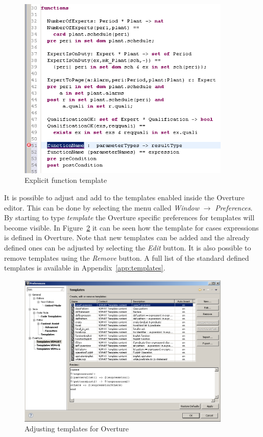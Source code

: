 \documentclass{overturerep}
\begin{document}
{\begin{figure}
\begin{center}
\includegraphics[width=4in]{figures/FunctionTemplate}
\caption{Explicit function template}
\label{fig:functionTemplate}
\end{center}
\end{figure}

It is possible to adjust and add to the templates enabled inside the
Overture editor. This can be done by selecting the menu called
\emph{Window} $\rightarrow$ \emph{Preferences}. By starting to type
\emph{template} the Overture specific preferences for templates will
become visible. In Figure~\ref{fig:Templatepreferences} it can be seen
how the template for cases expressions is defined in Overture. Note
that new templates can be added and the already defined ones can be
adjusted by selecting the \emph{Edit} button. It is also possible to
remove templates using the \emph{Remove} button. A full list of the
standard defined templates is available in Appendix~\ref{app:templates}.

\begin{figure}
\begin{center}
\includegraphics[width=4in]{screendumps/templatesRT}
\caption{Adjusting templates for Overture}
\label{fig:Templatepreferences}
\end{center}
\end{figure}

}
\end{document}
